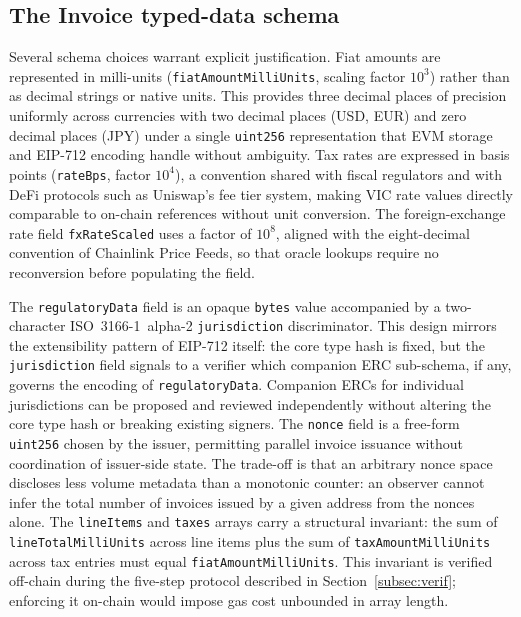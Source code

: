 \documentclass[11pt,a4paper]{article}
\begin{document}
\subsection{The Invoice typed-data schema}

Several schema choices warrant explicit justification. Fiat amounts are represented in milli-units (\texttt{fiatAmountMilliUnits}, scaling factor $10^3$) rather than as decimal strings or native units. This provides three decimal places of precision uniformly across currencies with two decimal places (USD, EUR) and zero decimal places (JPY) under a single \texttt{uint256} representation that EVM storage and EIP-712 encoding handle without ambiguity. Tax rates are expressed in basis points (\texttt{rateBps}, factor $10^4$), a convention shared with fiscal regulators and with DeFi protocols such as Uniswap's fee tier system, making VIC rate values directly comparable to on-chain references without unit conversion. The foreign-exchange rate field \texttt{fxRateScaled} uses a factor of $10^8$, aligned with the eight-decimal convention of Chainlink Price Feeds, so that oracle lookups require no reconversion before populating the field.

The \texttt{regulatoryData} field is an opaque \texttt{bytes} value accompanied by a two-character ISO~3166-1~alpha-2 \texttt{jurisdiction} discriminator. This design mirrors the extensibility pattern of EIP-712 itself: the core type hash is fixed, but the \texttt{jurisdiction} field signals to a verifier which companion ERC sub-schema, if any, governs the encoding of \texttt{regulatoryData}. Companion ERCs for individual jurisdictions can be proposed and reviewed independently without altering the core type hash or breaking existing signers. The \texttt{nonce} field is a free-form \texttt{uint256} chosen by the issuer, permitting parallel invoice issuance without coordination of issuer-side state. The trade-off is that an arbitrary nonce space discloses less volume metadata than a monotonic counter: an observer cannot infer the total number of invoices issued by a given address from the nonces alone. The \texttt{lineItems} and \texttt{taxes} arrays carry a structural invariant: the sum of \texttt{lineTotalMilliUnits} across line items plus the sum of \texttt{taxAmountMilliUnits} across tax entries must equal \texttt{fiatAmountMilliUnits}. This invariant is verified off-chain during the five-step protocol described in Section~\ref{subsec:verif}; enforcing it on-chain would impose gas cost unbounded in array length.
\end{document}
